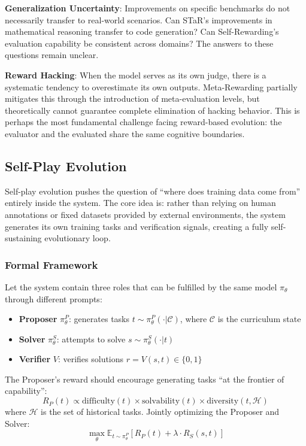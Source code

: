 \textbf{Generalization Uncertainty}: Improvements on specific benchmarks do not necessarily transfer to real-world scenarios. Can STaR's improvements in mathematical reasoning transfer to code generation? Can Self-Rewarding's evaluation capability be consistent across domains? The answers to these questions remain unclear.

\textbf{Reward Hacking}: When the model serves as its own judge, there is a systematic tendency to overestimate its own outputs. Meta-Rewarding partially mitigates this through the introduction of meta-evaluation levels, but theoretically cannot guarantee complete elimination of hacking behavior. This is perhaps the most fundamental challenge facing reward-based evolution: the evaluator and the evaluated share the same cognitive boundaries.

\subsection{Self-Play Evolution}\label{sec:selfplay}

Self-play evolution pushes the question of ``where does training data come from'' entirely inside the system. The core idea is: rather than relying on human annotations or fixed datasets provided by external environments, the system generates its own training tasks and verification signals, creating a fully self-sustaining evolutionary loop.

\subsubsection{Formal Framework}

\begin{definition}\label{def:selfplay}
Let the system contain three roles that can be fulfilled by the same model $\pi_\theta$ through different prompts:
\begin{itemize}
\item \textbf{Proposer} $\pi_\theta^P$: generates tasks $t \sim \pi_\theta^P(\cdot | \mathcal{C})$, where $\mathcal{C}$ is the curriculum state
\item \textbf{Solver} $\pi_\theta^S$: attempts to solve $s \sim \pi_\theta^S(\cdot | t)$
\item \textbf{Verifier} $V$: verifies solutions $r = V(s, t) \in \{0, 1\}$
\end{itemize}
The Proposer's reward should encourage generating tasks ``at the frontier of capability'':
\begin{equation}
R_P(t) \propto \text{difficulty}(t) \times \text{solvability}(t) \times \text{diversity}(t, \mathcal{H})
\label{eq:selfplay-reward}
\end{equation}
where $\mathcal{H}$ is the set of historical tasks. Jointly optimizing the Proposer and Solver:
\begin{equation}
\max_\theta \mathbb{E}_{t \sim \pi_\theta^P}\left[R_P(t) + \lambda \cdot R_S(s, t)\right]
\label{eq:selfplay-joint}
\end{equation}
\end{definition}

